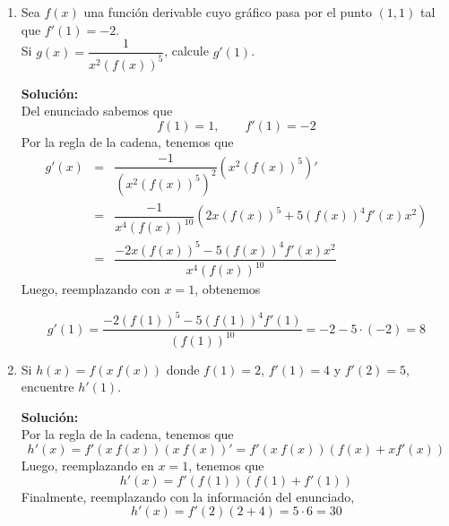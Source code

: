 \documentclass[12pt]{article}
\newenvironment{solucion}
{\begin{mdframed}[backgroundcolor=black!10]
		{\bf Solución:}\\
	}
	{
	\end{mdframed}
}
\newenvironment{preguntas}
{\begin{enumerate}\itemsep12pt
	}
	{
	\end{enumerate}
}
\begin{document}
\begin{preguntas}
\begin{solucion}
\begin{enumerate}[a)]
$$\begin{array}{rcl}
	f'(x) & = & 5^x ln(5) cos(3x) + 5^x (-\sin 3x)3 \\
	f'(x) & = & ln(5)5^x cos(3x) - 3\cdot 5^x \sin 3x
	\end{array}$$
\end{enumerate}
\end{solucion}
\item Sea $f(x)$ una función derivable cuyo gráfico pasa por el punto $(1,1)$ tal que $f'(1) = -2$.\\
Si $g(x) = \dfrac{1}{x^2(f(x))^5}$, calcule $g'(1)$.
\begin{solucion}
Del enunciado sabemos que
$$f(1) = 1, \qquad f'(1) = -2$$
Por la regla de la cadena, tenemos que
$$\begin{array}{rcl}
g'(x) & = & \dfrac{-1}{(x^2(f(x))^5)^2}(x^2(f(x))^5)'\\
& = & \dfrac{-1}{x^4(f(x))^{10}}(2x(f(x))^5 + 5(f(x))^4f'(x)x^2)\\
& = & \dfrac{-2x(f(x))^5 - 5(f(x))^4f'(x)x^2}{x^4(f(x))^{10}}
\end{array}$$
Luego, reemplazando con $x=1$, obtenemos

$$g'(1) =\dfrac{-2(f(1))^5 - 5(f(1))^4f'(1)}{(f(1))^{10}} = -2-5\cdot (-2) = 8$$
\end{solucion}
\item Si $h(x) = f(x\ f(x))$ donde $f(1)=2$, $f'(1)=4$ y $f'(2) = 5$, encuentre $h'(1)$.
\begin{solucion}
Por la regla de la cadena, tenemos que
$$h'(x) = f'(x\ f(x)) (x\ f(x))' = f'(x\ f(x))(f(x) + xf'(x))$$
Luego, reemplazando en $x=1$, tenemos que
$$h'(x) = f'(f(1))(f(1) + f'(1))$$
Finalmente, reemplazando con la información del enunciado,
$$h'(x) = f'(2)(2+4) = 5\cdot 6 = 30$$
\end{solucion}
\end{preguntas}
\end{document}
